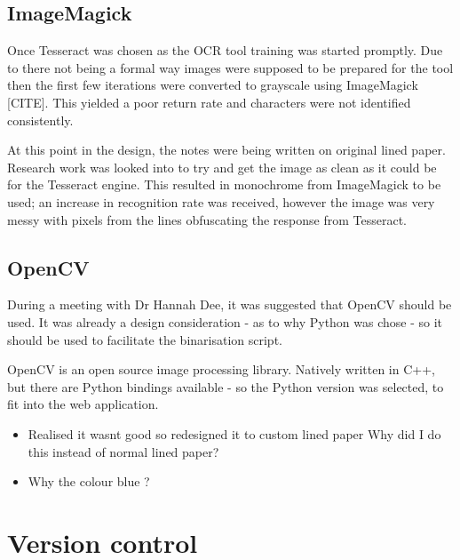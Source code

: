 \subsection{ImageMagick}
Once Tesseract was chosen as the OCR tool training was started promptly. Due to there not being a formal way images were supposed to be prepared for the tool then the first few iterations were converted to grayscale using ImageMagick [CITE]. This yielded a poor return rate and characters were not identified consistently.

At this point in the design, the notes were being written on original lined paper. Research work was looked into to try and get the image as clean as it could be for the Tesseract engine. This resulted in monochrome from ImageMagick to be used; an increase in recognition rate was received, however the image was very messy with pixels from the lines obfuscating the response from Tesseract.

\subsection{OpenCV}
During a meeting with Dr Hannah Dee, it was suggested that OpenCV should be used. It was already a design consideration - as to why Python was chose - so it should be used to facilitate the binarisation script.

OpenCV is an open source image processing library. Natively written in C++, but there are Python bindings available - so the Python version was selected, to fit into the web application.





\begin{itemize}
  \item Realised it wasnt good so redesigned it to custom lined paper Why did I do this instead of normal lined paper?
  \item Why the colour blue ?
\end{itemize}

\section{Version control}
